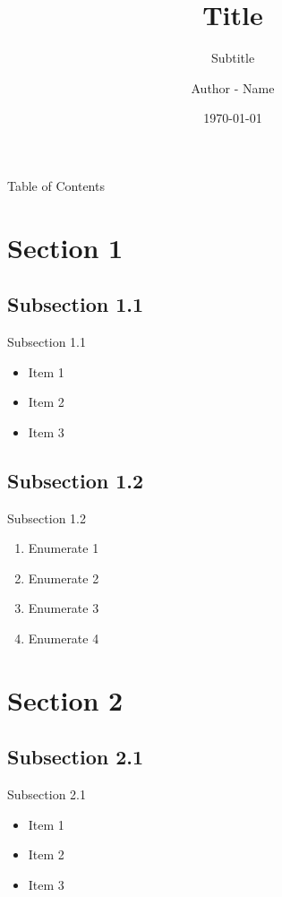 \documentclass[aspectratio=169]{beamer}
\title{Title}
\subtitle{Subtitle}
\author[A-N]{Author - Name}
\institute{
            University\\
            Faculty\\
            Professional School
        }
\date{\today}
\begin{document}
    \begin{frame}
        \titlepage
    \end{frame}
    \begin{frame}{Table of Contents}
        \tableofcontents
    \end{frame}
    \section{Section 1}
        \begin{frame}
            \lipsum[1]
        \end{frame}
        \subsection{Subsection 1.1}
            \begin{frame}{Subsection 1.1}
                \begin{itemize}
                    \item Item 1
                    \item Item 2
                    \item Item 3
                \end{itemize}
            \end{frame}
        \subsection{Subsection 1.2}
            \begin{frame}{Subsection 1.2}
                \begin{enumerate}
                    \item Enumerate 1
                    \item Enumerate 2
                    \item Enumerate 3
                    \item Enumerate 4
                \end{enumerate}
            \end{frame}
    \section{Section 2}
        \begin{frame}
            \lipsum[2]
        \end{frame}
        \subsection{Subsection 2.1}
            \begin{frame}{Subsection 2.1}
                \begin{itemize}
                    \item Item 1
                    \item Item 2
                    \item Item 3
                \end{itemize}
            \end{frame}
\end{document}
